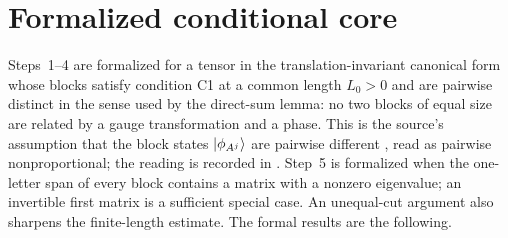 \documentclass{article}
\begin{document}
\section{Formalized conditional core}

Steps~1--4 are formalized for a tensor in the translation-invariant canonical
form whose blocks satisfy condition C1 at a common length $L_0>0$ and are
pairwise distinct in the sense used by the direct-sum lemma: no two blocks of
equal size are related by a gauge transformation and a phase. This is the
source's assumption that the block states $|\phi_{A^j}\rangle$ are pairwise
different \cite[lines~1329--1330]{PerezGarcia2007MPSReps}, read as pairwise
nonproportional; the reading is recorded in
. Step~5 is
formalized when the one-letter span of every block contains a matrix with a
nonzero eigenvalue; an invertible first matrix is a sufficient special case.
An unequal-cut argument also sharpens the finite-length estimate. The formal
results are the following.
\end{document}
